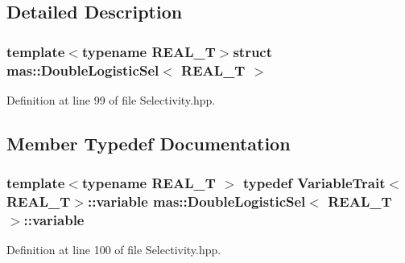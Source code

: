 \subsection{Detailed Description}
\subsubsection*{template$<$typename R\-E\-A\-L\-\_\-\-T$>$struct mas\-::\-Double\-Logistic\-Sel$<$ R\-E\-A\-L\-\_\-\-T $>$}



Definition at line 99 of file Selectivity.\-hpp.



\subsection{Member Typedef Documentation}
\hypertarget{structmas_1_1_double_logistic_sel_aa9c8db47e992fdddb25f535eb0d6b343}{
\subsubsection[{variable}]{\setlength{\rightskip}{0pt plus 5cm}template$<$typename R\-E\-A\-L\-\_\-\-T $>$ typedef {\bf Variable\-Trait}$<$R\-E\-A\-L\-\_\-\-T$>$\-::{\bf variable} {\bf mas\-::\-Double\-Logistic\-Sel}$<$ R\-E\-A\-L\-\_\-\-T $>$\-::{\bf variable}}}\label{structmas_1_1_double_logistic_sel_aa9c8db47e992fdddb25f535eb0d6b343}


Definition at line 100 of file Selectivity.\-hpp.



